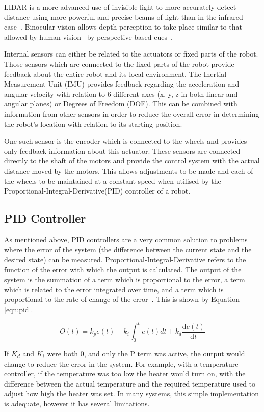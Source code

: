 LIDAR is a more advanced use of invisible light to more accurately detect
distance using more powerful and precise beams of light than in the infrared
case~\cite{lidar}. Binocular vision allows depth perception to take place
similar to that allowed by human vision~\cite{read2005early} by perspective-based cues~\cite{pfautz2002depth}.

Internal sensors can either be related to the actuators or fixed parts of the
robot. Those sensors which are connected to the fixed parts of the robot provide
feedback about the entire robot and its local environment. The Inertial
Measurement Unit (IMU) provides feedback regarding the acceleration and angular
velocity with relation to 6 different axes (x, y, z in both linear and angular
planes) or Degrees of Freedom (DOF). This can be combined with information from
other sensors in order to reduce the overall error in determining the robot's
location with relation to its starting position.

One such sensor is the encoder which is connected to the wheels and provides
only feedback information about this actuator. These sensors are connected
directly to the shaft of the motors and provide the control system with the
actual distance moved by the motors. This allows adjustments to be made and each
of the wheels to be maintained at a constant speed when utilised by the
Proportional-Integral-Derivative(PID) controller of a robot.

\subsection{PID Controller}\label{litreview/robotics/pid}
As mentioned above, PID controllers are a very common solution to problems where the error of the
system (the difference between the current state and the desired state) can be
measured. Proportional-Integral-Derivative refers to the
function of the error with which the output is calculated. The output of the
system is the summation of a term which is proportional to the error, a term
which is related to the error integrated over time, and a term which is
proportional to the rate of change of the error~\cite{aastrom2006advanced}. This is shown by Equation \ref{eqn:pid}.

\begin{equation}
\label{eqn:pid}
O(t) = k_{p}e(t) + k_i\int_{0}^{t}e(t)dt + k_d \frac{\mathrm{d} e(t) }{\mathrm{d} t}
\end{equation}

If $K_d$ and $K_i$ were both 0, and only the P term was active, the output
would change to reduce the error in the system. For example, with a
temperature controller, if the temperature was too low the heater would
turn on, with the difference between the actual temperature and the required
temperature used to adjust how high the heater was set. In many systems, this simple
implementation is adequate, however it has several limitations.

